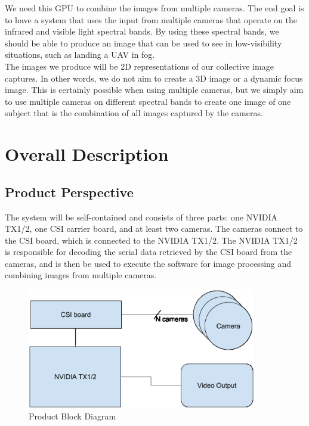 \documentclass[letterpaper,10pt,serif,draftclsnofoot,onecolumn,compsoc,titlepage]{IEEEtran}
\begin{document}
We need this GPU to combine the images from multiple cameras. The end goal is to have 
a system that uses the input from multiple cameras that operate on the infrared and 
visible light spectral bands. By using these spectral bands, we should be able to 
produce an image that can be used to see in low-visibility situations, such as landing 
a UAV in fog.\\

The images we produce will be 2D representations of our collective image captures. In 
other words, we do not aim to create a 3D image or a dynamic focus image. This is 
certainly possible when using multiple cameras, but we simply aim to use multiple 
cameras on different spectral bands to create one image of one subject that is the 
combination of all images captured by the cameras.\\


\section{Overall Description}

\subsection{Product Perspective}

The system will be self-contained and consists of three parts: one NVIDIA TX1/2, 
one CSI carrier board, and at least two cameras. The cameras connect to the CSI board, 
which is connected to the NVIDIA TX1/2. The NVIDIA TX1/2 is responsible for decoding 
the serial data retrieved by the CSI board from the cameras, and is then be used to 
execute the software for image processing and combining images from multiple cameras.\\

\begin{figure}[H]
	\centering
	\label{fig:CopyOnWriteBefore}
	\includegraphics[width=10cm]{images/diagram.eps}
	\caption{Product Block Diagram \label{overflow}}
\end{figure}
\end{document}
